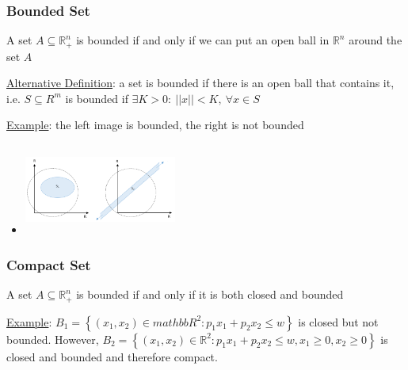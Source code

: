 \documentclass{article}
\begin{document}
\subsubsection{Bounded Set}
A set $A \subseteq \mathbb{R}_{+}^{n}$ is bounded if and only if we can put an open ball in $\mathbb{R}^{n}$ around the set $A$ \par \vspace{0.3em}
  \underline{Alternative Definition}: a set is bounded if there is an open ball that contains it, i.e. $S \subseteq R^{m}$ is bounded if $\exists K > 0: \ ||x|| < K, \ \forall x \in S$ \par
  \underline{Example}: the left image is bounded, the right is not bounded
  \begin{itemize}
    \item  \includegraphics[width=5cm, height=3cm]{pic5}
  \end{itemize}
  \par
\vspace{6mm}
\subsubsection{Compact Set}
A set $A \subseteq \mathbb{R}_{+}^{n}$ is bounded if and only if it is both closed and bounded \par \vspace{0.3em}
  \underline{Example}: $B_{1} = \left\{ (x_{1},x_{2}) \in mathbb{R}^{2}: p_{1}x_{1} + p_{2}x_{2} \leq w \right\}$ is closed but not bounded. However, $B_{2} = \left\{ (x_{1},x_{2}) \in \mathbb{R}^{2}: p_{1}x_{1} + p_{2}x_{2} \leq w, x_{1} \geq 0, x_{2} \geq 0 \right\}$ is closed and bounded and therefore compact.
  \par
\vspace{6mm}
\end{document}
